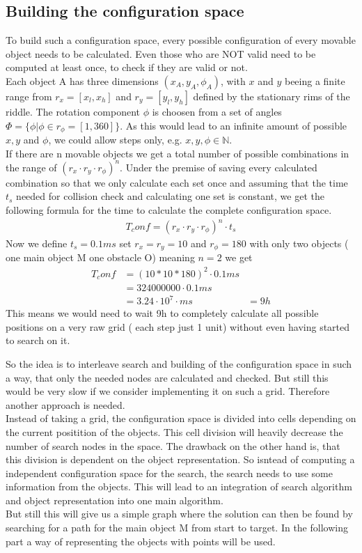 \subsection{Building the configuration space}
\label{subsec:confspace}
To build such a configuration space, every possible configuration of every movable object needs to be calculated. Even those who are NOT valid need to be computed at least once, to check if they are valid or not.\\
Each object A has three dimensions $(x_A,y_A,\phi_A)$, with $x$ and $y$ beeing a finite range from $r_x=[x_l, x_h]$ and $r_y=[y_l, y_h]$ defined by the stationary rims of the riddle. The rotation component $\phi$ is choosen from a set of angles $\Phi = \{ \phi | \phi \in r_\phi=[1, 360] \}$. As this would lead to an infinite amount of possible $x,y$ and $\phi$, we could allow steps only, e.g. $x,y,\phi \in \mathbb{N}$.\\
If there are n movable objects we get a total number of possible combinations in the range of $(r_x\cdot r_y \cdot r_\phi )^n$.
Under the premise of saving every calculated combination so that we only calculate each set once and assuming that the time $t_s$ needed for collision check and calculating one set is constant, we get the following formula for the time to calculate the complete configuration space.
\begin{align*}
 T_conf = (r_x\cdot r_y \cdot r_\phi )^n \cdot t_s
\end{align*}
Now we define $t_s = 0.1 ms$ set $r_x = r_y = 10$ and $r_\phi = 180$ with only two objects ( one main object M one obstacle O) meaning $n=2$ we get
\begin{align*}
T_conf &= (10*10*180)^2 \cdot 0.1ms\\
	&=   324000000 \cdot 0.1 ms\\
	&= 3.24 \cdot 10^7 \cdot ms
	&= 9 h
\end{align*} 
This means we would need to wait 9h to completely calculate all possible positions on a very raw grid ( each step just 1 unit) without even having started to search on it.

So the idea is to interleave search and building of the configuration space in such a way, that only the needed nodes are calculated and checked.
But still this would be very slow if we consider implementing it on such a grid. Therefore another approach is needed.\\
Instead of taking a grid, the configuration space is divided into cells depending on the current positition of the objects. This cell division will heavily decrease the number of search nodes in the space. The drawback on the other hand is, that this division is dependent on the object representation. So isntead of computing a independent configuration space for the search, the search needs to use some information from the objects. This will lead to an integration of search algorithm and object representation into one main algorithm.\\
But still this will give us a simple graph where the solution can then be found by searching for a path for the main object M from start to target. In the following part a way of representing the objects with points will be used.



